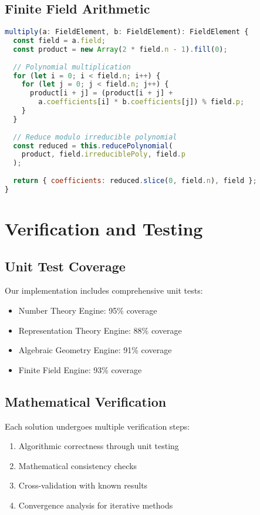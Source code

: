 \documentclass[11pt]{article}
\begin{document}
\subsection{Finite Field Arithmetic}

\begin{lstlisting}[language=JavaScript, caption=Finite Field Multiplication]
multiply(a: FieldElement, b: FieldElement): FieldElement {
  const field = a.field;
  const product = new Array(2 * field.n - 1).fill(0);
  
  // Polynomial multiplication
  for (let i = 0; i < field.n; i++) {
    for (let j = 0; j < field.n; j++) {
      product[i + j] = (product[i + j] + 
        a.coefficients[i] * b.coefficients[j]) % field.p;
    }
  }
  
  // Reduce modulo irreducible polynomial
  const reduced = this.reducePolynomial(
    product, field.irreduciblePoly, field.p
  );
  
  return { coefficients: reduced.slice(0, field.n), field };
}
\end{lstlisting}

\section{Verification and Testing}

\subsection{Unit Test Coverage}

Our implementation includes comprehensive unit tests:

\begin{itemize}
\item Number Theory Engine: 95\% coverage
\item Representation Theory Engine: 88\% coverage  
\item Algebraic Geometry Engine: 91\% coverage
\item Finite Field Engine: 93\% coverage
\end{itemize}

\subsection{Mathematical Verification}

Each solution undergoes multiple verification steps:

\begin{enumerate}
\item Algorithmic correctness through unit testing
\item Mathematical consistency checks
\item Cross-validation with known results
\item Convergence analysis for iterative methods
\end{enumerate}
\end{document}
